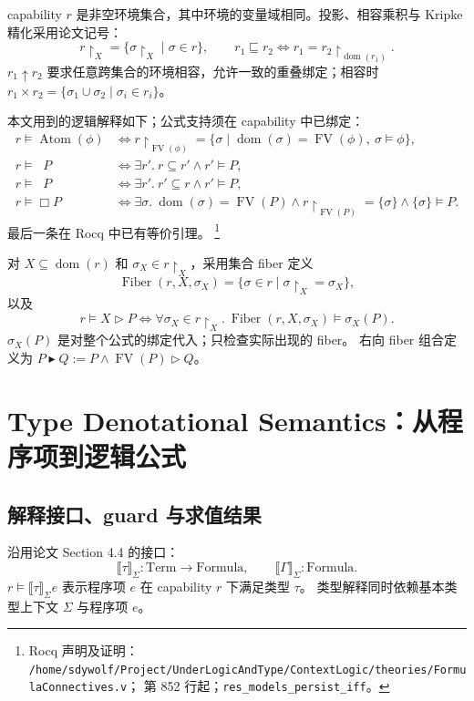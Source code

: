 \documentclass[UTF8,a4paper,11pt,fontset=fandol]{ctexart}
\newcommand{\FV}{\operatorname{FV}}
\newcommand{\dom}{\operatorname{dom}}
\newcommand{\Fib}{\operatorname{Fiber}}
\newcommand{\Atom}{\operatorname{Atom}}
\newcommand{\omod}{\mathop{\boxed{\scriptstyle\mathrm{o}}}\nolimits}
\newcommand{\umod}{\mathop{\boxed{\scriptstyle\mathrm{u}}}\nolimits}
\newcommand{\Den}[1]{\llbracket #1\rrbracket}
\newcommand{\rocqnote}[3]{%
  \footnote{Rocq 声明及证明：
  \nolinkurl{/home/sdywolf/Project/UnderLogicAndType/#1}；
  第 #2 行起；#3。}}
\begin{document}
capability $r$ 是非空环境集合，其中环境的变量域相同。投影、相容乘积与 Kripke 精化采用论文记号：
\[
 r\upharpoonright_X=\{\sigma\upharpoonright_X\mid\sigma\in r\},\qquad
 r_1\sqsubseteq r_2\Longleftrightarrow r_1=r_2\upharpoonright_{\dom(r_1)}.
\]
$r_1\uparrow r_2$ 要求任意跨集合的环境相容，允许一致的重叠绑定；相容时
$r_1\times r_2=\{\sigma_1\cup\sigma_2\mid\sigma_i\in r_i\}$。

本文用到的逻辑解释如下；公式支持须在 capability 中已绑定：
\begin{align*}
 r\models\Atom(\phi)&\Longleftrightarrow
 r\upharpoonright_{\FV(\phi)}
 =\{\sigma\mid\dom(\sigma)=\FV(\phi),\ \sigma\models\phi\},\\
 r\models\omod P&\Longleftrightarrow\exists r'.\ r\subseteq r'\land r'\models P,\\
 r\models\umod P&\Longleftrightarrow\exists r'.\ r'\subseteq r\land r'\models P,\\
 r\models\Box P&\Longleftrightarrow\exists\sigma.\
 \dom(\sigma)=\FV(P)\land r\upharpoonright_{\FV(P)}=\{\sigma\}\land\{\sigma\}\models P.
\end{align*}
最后一条在 Rocq 中已有等价引理。\rocqnote{ContextLogic/theories/FormulaConnectives.v}{852}{\texttt{res\_models\_persist\_iff}}

对 $X\subseteq\dom(r)$ 和 $\sigma_X\in r\upharpoonright_X$，采用集合 fiber 定义
\[
 \Fib(r,X,\sigma_X)=\{\sigma\in r\mid\sigma\upharpoonright_X=\sigma_X\},
\]
以及
\begin{equation}\label{eq:fiber}
 r\models X\triangleright P\Longleftrightarrow
 \forall\sigma_X\in r\upharpoonright_X.\
 \Fib(r,X,\sigma_X)\models\sigma_X(P).
\end{equation}
$\sigma_X(P)$ 是对整个公式的绑定代入；只检查实际出现的 fiber。
右向 fiber 组合定义为 $P\blacktriangleright Q:=P\land\FV(P)\triangleright Q$。

\section{Type Denotational Semantics：从程序项到逻辑公式}

\subsection{解释接口、guard 与求值结果}

沿用论文 Section 4.4 的接口：
\[
 \boxed{\Den{\tau}_\Sigma:\mathrm{Term}\to\mathrm{Formula},\qquad
        \Den{\Gamma}_\Sigma:\mathrm{Formula}.}
\]
$r\models\Den{\tau}_\Sigma e$ 表示程序项 $e$ 在 capability $r$ 下满足类型 $\tau$。
类型解释同时依赖基本类型上下文 $\Sigma$ 与程序项 $e$。
\end{document}
